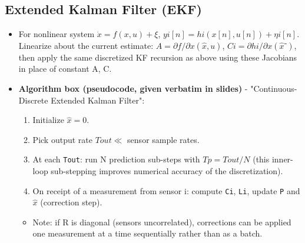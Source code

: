 \documentclass[11pt]{article}
\begin{document}
\subsection{Extended Kalman Filter (EKF)}
\begin{itemize}
\item For nonlinear system $\dot{x}=f(x,u)+ξ$, $yi[n]=hi(x[n],u[n])+ηi[n]$. Linearize about the current estimate: $A=∂f/∂x(\hat{x},u)$, $Ci=∂hi/∂x(\hat{x}⁻)$, then apply the same discretized KF recursion as above using these Jacobians in place of constant A, C.
\item \textbf{Algorithm box (pseudocode, given verbatim in slides)} - "Continuous-Discrete Extended Kalman Filter":
\begin{enumerate}
\item Initialize $\hat{x}=0$.
\item Pick output rate $Tout ≪$ sensor sample rates.
\item At each \texttt{Tout}: run N prediction sub-steps with $Tp = Tout/N$ (this inner-loop sub-stepping improves numerical accuracy of the discretization).
\item On receipt of a measurement from sensor i: compute \texttt{Ci}, \texttt{Li}, update \texttt{P} and $\hat{x}$ (correction step).
\end{enumerate}
\begin{itemize}
\item Note: if R is diagonal (sensors uncorrelated), corrections can be applied one measurement at a time sequentially rather than as a batch.
\end{itemize}
\end{itemize}
\end{document}
